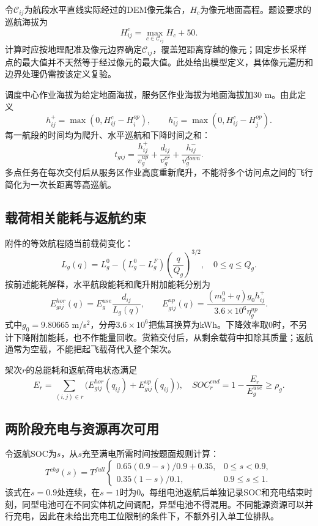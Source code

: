 令$\mathcal C_{ij}$为航段水平直线实际经过的DEM像元集合，$H_c$为像元地面高程。题设要求的巡航海拔为
\begin{equation}
H_{ij}^{c}=\max_{c\in\mathcal C_{ij}}H_c+50.\label{eq:terrain}
\end{equation}
计算时应按地理配准及像元边界确定$\mathcal C_{ij}$，覆盖短距离穿越的像元；固定步长采样点的最大值并不天然等于经过像元的最大值。此处给出模型定义，具体像元遍历和边界处理仍需按该定义复验。

调度中心作业海拔为给定地面海拔，服务区作业海拔为地面海拔加30 m。由此定义
\begin{equation}
h_{ij}^{+}=\max(0,H_{ij}^{c}-H_i^{op}),\qquad
h_{ij}^{-}=\max(0,H_{ij}^{c}-H_j^{op}).
\end{equation}
每一航段的时间均为爬升、水平巡航和下降时间之和：
\begin{equation}
t_{gij}=\frac{h_{ij}^{+}}{v_g^{up}}+\frac{d_{ij}}{v_g^{cr}}+\frac{h_{ij}^{-}}{v_g^{down}}.\label{eq:leg-time}
\end{equation}
多点任务在每次交付后从服务区作业高度重新爬升，不能将多个访问点之间的飞行简化为一次长距离等高巡航。

\subsection{载荷相关能耗与返航约束}
附件的等效航程随当前载荷变化：
\begin{equation}
L_g(q)=L_g^0-(L_g^0-L_g^F)\left(\frac{q}{Q_g}\right)^{3/2},\quad 0\le q\le Q_g.
\label{eq:range}
\end{equation}
按前述能耗解释，水平航段能耗和爬升附加能耗分别为
\begin{equation}
E_{gij}^{hor}(q)=E_g^{use}\frac{d_{ij}}{L_g(q)},\qquad
E_{gij}^{up}(q)=\frac{(m_g^0+q)g_0h_{ij}^{+}}{3.6\times10^6\eta_g^{up}}.
\label{eq:energy}
\end{equation}
式中$g_0=9.80665$ m/s$^2$，分母$3.6\times10^6$把焦耳换算为kWh。下降效率取0时，不另计下降附加能耗，也不作能量回收。货箱交付后，从剩余载荷中扣除其质量；返航通常为空载，不能把起飞载荷代入整个架次。

架次$r$的总能耗和返航荷电状态满足
\begin{equation}
E_r=\sum_{(i,j)\in r}\bigl(E_{gij}^{hor}(q_{ij})+E_{gij}^{up}(q_{ij})\bigr),
\quad SOC_r^{end}=1-\frac{E_r}{E_g^{use}}\ge\rho_g.
\label{eq:soc}
\end{equation}

\subsection{两阶段充电与资源再次可用}
令返航SOC为$s$，从$s$充至满电所需时间按题面规则计算：
\begin{equation}
T^{chg}(s)=T^{full}\begin{cases}
0.65(0.9-s)/0.9+0.35,&0\le s<0.9,\\
0.35(1-s)/0.1,&0.9\le s\le1.
\end{cases}\label{eq:charge}
\end{equation}
该式在$s=0.9$处连续，在$s=1$时为0。每组电池返航后单独记录SOC和充电结束时刻，同型电池可在不同实体机之间调配，异型电池不得混用。不同能源资源可以并行充电，因此在未给出充电工位限制的条件下，不额外引入单工位排队。
